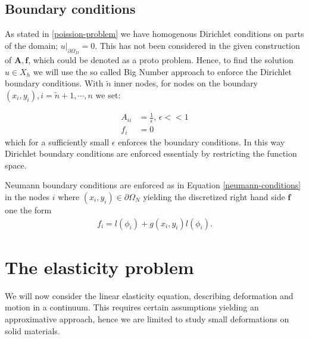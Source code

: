 \documentclass[5pt,a4paper,english]{elsarticle}%
\newcommand{\restr}[2]{\ensuremath{\left.#1\right|_{#2}}}
\begin{document}
\subsection{Boundary conditions}
As stated in \eqref{poission-problem} we have homogenous Dirichlet conditions on parts of the domain; $\restr{u}{\partial \Omega_D} =  0 $. This has not been considered in the given construction of $\bm A,\bm f$, which could be denoted as a proto problem. Hence, to find the solution $u \in X_h$ we will use the so called Big Number approach \cite[p. 16]{Lecture_Note_4} to enforce the Dirichlet boundary conditions. With $\tilde n$ inner nodes, for nodes on the boundary $(x_i,y_i), i= \tilde n +1,\cdots, n$ we set:


\begin{equation*}
    \begin{aligned}
    A_{ii} &= \frac{1}{\epsilon}, \, \epsilon << 1 \\
    f_i &= 0
    \end{aligned}
\end{equation*}
which for a sufficiently small $\epsilon$ enforces the boundary conditions. In this way Dirichlet boundary conditions are enforced essentialy by restricting the function space. 

Neumann boundary conditions are enforced as in Equation \eqref{neumann-conditions} in the nodes $i$ where $(x_i,y_i) \in \partial \Omega_N$ yielding the discretized right hand side $\bm f$ one the form
\begin{align}
    f_i = l(\phi_i) + g(x_i,y_i)l(\phi_i).
\end{align}


\section{The elasticity problem } \label{seq-elasticity}

We will now consider the linear elasticity equation, describing deformation and motion in a continuum. This requires certain assumptions yielding an approximative approach, hence we are limited to study small deformations on solid materials.
\end{document}
